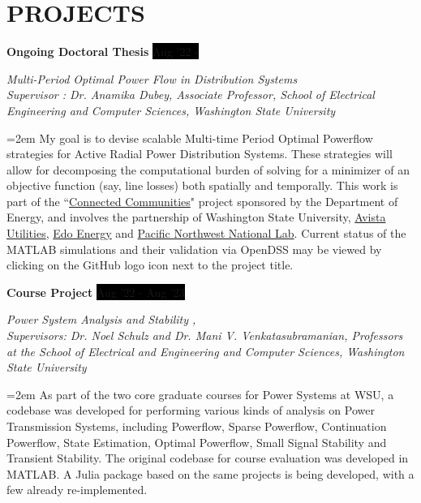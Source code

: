 \documentclass[paper=a4,fontsize=11pt]{scrartcl} %
\newcommand{\sepspace}{\vspace*{1em}}		%
\newcommand{\NewPart}[1]{\section*{\uppercase{#1}}}
\newcommand{\EducationEntry}[4]{
		\noindent \textbf{#1} \hfill      %
		\colorbox{Black}{%
			\parbox{10em}{%
			\hfill\color{White}#2}} \par  %
		\noindent \textit{#3} \par        %
		\noindent\hangindent=2em\hangafter=0 \small #4 %
		\normalsize \par}
\newcommand{\WorkEntry}[4]{				  %
		\noindent \textbf{#1} \hfill      %
		\colorbox{Black}{\color{White}#2} \par  %
		\noindent \textit{#3} \par              %
		\noindent\hangindent=2em\hangafter=0 \small #4 %
		\normalsize \par}
\begin{document}


\NewPart{Projects}{}

\WorkEntry{Ongoing Doctoral Thesis}{Aug '22 - }{Multi-Period Optimal Power Flow in Distribution Systems \href{https://github.com/Realife-Brahmin/MultiPeriod-DistOPF-Benchmark}{\textcolor{matlaborange}{\faGithub}}\\ Supervisor : Dr. Anamika Dubey, Associate Professor, School of Electrical Engineering and Computer Sciences, Washington State University}{My goal is to devise scalable Multi-time Period Optimal Powerflow strategies for Active Radial Power Distribution Systems. These strategies will allow for decomposing the computational burden of solving for a minimizer of an objective function (say, line losses) both spatially and temporally. This work is part of the ``\href{https://www.energy.gov/eere/solar/connected-communities-funding-program}{Connected Communities}" project sponsored by the Department of Energy, and involves the partnership of Washington State University, \href{https://investor.avistacorp.com/}{Avista Utilities}, \href{https://edoenergy.com/about-edo/}{Edo Energy} and \href{https://www.pnnl.gov/about}{Pacific Northwest National Lab}. Current status of the MATLAB simulations and their validation via OpenDSS may be viewed by clicking on the GitHub logo icon next to the project title.}

\clearpage

\WorkEntry{Course Project}{Aug '22 - Aug '23}{Power System Analysis and Stability \href{https://github.com/Realife-Brahmin/PowerSystems-Analysis-Stability-WSU}{\textcolor{matlaborange}{\faGithub}}, \href{https://github.com/ninadkgaikwad/PowerEdu}{\textcolor{juliapurple}{ \faGithub }} \\ Supervisors: Dr. Noel Schulz and Dr. Mani V. Venkatasubramanian, Professors at the School of Electrical and Engineering and Computer Sciences, Washington State University}{As part of the two core graduate courses for Power Systems at WSU, a codebase was developed for performing various kinds of analysis on Power Transmission Systems, including Powerflow, Sparse Powerflow, Continuation Powerflow, State Estimation, Optimal Powerflow, Small Signal Stability and Transient Stability. The original codebase for course evaluation was developed in MATLAB. A Julia package based on the same projects is being developed, with a few already re-implemented.}
\end{document}
